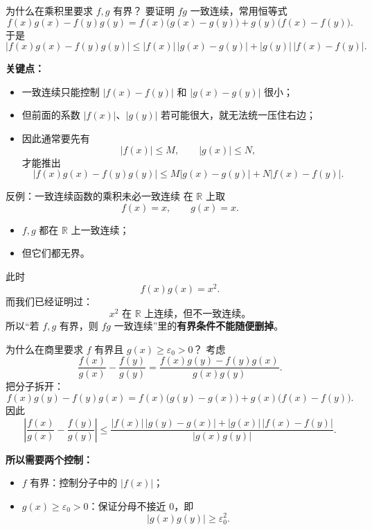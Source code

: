 ﻿\documentclass[aspectratio=169,11pt]{ctexbeamer}
\newcommand{\R}{\mathbb{R}}
\begin{document}
\begin{frame}{为什么在乘积里要求 $f,g$ 有界？}
要证明 $fg$ 一致连续，常用恒等式
\[
  f(x)g(x)-f(y)g(y)
  =
  f(x)\bigl(g(x)-g(y)\bigr)+g(y)\bigl(f(x)-f(y)\bigr).
\]
于是
\[
  |f(x)g(x)-f(y)g(y)|
  \le |f(x)|\,|g(x)-g(y)|+|g(y)|\,|f(x)-f(y)|.
\]
\vspace{0.5em}

\textbf{关键点：}
\begin{itemize}
  \item 一致连续只能控制 $|f(x)-f(y)|$ 和 $|g(x)-g(y)|$ 很小；
  \item 但前面的系数 $|f(x)|$、$|g(y)|$ 若可能很大，就无法统一压住右边；
  \item 因此通常要先有
  \[
    |f(x)|\le M,\qquad |g(x)|\le N,
  \]
  才能推出
  \[
    |f(x)g(x)-f(y)g(y)|
    \le M|g(x)-g(y)|+N|f(x)-f(y)|.
  \]
\end{itemize}
\end{frame}

\begin{frame}{反例：一致连续函数的乘积未必一致连续}
在 $\R$ 上取
\[
  f(x)=x,\qquad g(x)=x.
\]
\begin{itemize}
  \item $f,g$ 都在 $\R$ 上一致连续；
  \item 但它们都无界。
\end{itemize}
\vspace{0.5em}

此时
\[
  f(x)g(x)=x^2.
\]
而我们已经证明过：
\[
  x^2 \text{ 在 }\R\text{ 上连续，但不一致连续。}
\]
所以“若 $f,g$ 有界，则 $fg$ 一致连续”里的\textbf{有界条件不能随便删掉}。
\end{frame}

\begin{frame}{为什么在商里要求 $f$ 有界且 $g(x)\ge \varepsilon_0>0$？}
考虑
\[
  \frac{f(x)}{g(x)}-\frac{f(y)}{g(y)}
  =
  \frac{f(x)g(y)-f(y)g(x)}{g(x)g(y)}.
\]
把分子拆开：
\[
  f(x)g(y)-f(y)g(x)
  =
  f(x)\bigl(g(y)-g(x)\bigr)+g(x)\bigl(f(x)-f(y)\bigr).
\]
因此
\[
  \left|\frac{f(x)}{g(x)}-\frac{f(y)}{g(y)}\right|
  \le
  \frac{|f(x)|\,|g(y)-g(x)|+|g(x)|\,|f(x)-f(y)|}{|g(x)g(y)|}.
\]
\vspace{0.4em}

\textbf{所以需要两个控制：}
\begin{itemize}
  \item $f$ 有界：控制分子中的 $|f(x)|$；
  \item $g(x)\ge \varepsilon_0>0$：保证分母不接近 $0$，即
  \[
    |g(x)g(y)|\ge \varepsilon_0^2.
  \]
\end{itemize}
\end{frame}
\end{document}
